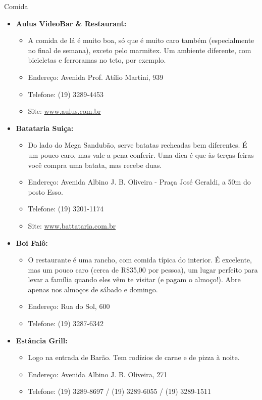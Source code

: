 \begin{story}{Comida}
\begin{itemize}

\item \textbf{Aulus VideoBar \& Restaurant:}
\begin{itemize}
\item A comida de lá é muito boa, só que é muito caro também (especialmente no final de semana), exceto pelo marmitex. Um ambiente diferente, com bicicletas e ferroramas no teto, por exemplo.
\item Endereço: Avenida Prof. Atílio Martini, 939
\item Telefone: (19) 3289-4453
\item Site: \url{www.aulus.com.br}
\end{itemize}

\item \textbf{Batataria Suiça:}
\begin{itemize}
\item Do lado do Mega Sandubão, serve batatas recheadas bem diferentes. É um pouco caro, mas vale a pena conferir. Uma dica é que às terças-feiras você compra uma batata, mas recebe duas.
\item Endereço: Avenida Albino J. B. Oliveira - Praça José Geraldi, a 50m do posto Esso.
\item Telefone: (19) 3201-1174
\item Site: \url{www.battataria.com.br}
\end{itemize}

\item \textbf{Boi Falô:}
\begin{itemize}
\item O restaurante é uma rancho, com comida típica do interior. É excelente, mas um pouco caro (cerca de R\$35,00 por pessoa), um lugar perfeito para levar a família quando eles vêm te visitar (e pagam o almoço!). Abre apenas nos almoços de sábado e domingo.
\item Endereço: Rua do Sol, 600
\item Telefone: (19) 3287-6342
\end{itemize}

\item \textbf{Estância Grill:}
\begin{itemize}
\item Logo na entrada de Barão. Tem rodízios de carne e de pizza à noite. 
\item Endereço: Avenida Albino J. B. Oliveira, 271
\item Telefone: (19) 3289-8697 / (19) 3289-6055 / (19) 3289-1511
\end{itemize}


\end{itemize}
\end{story}
